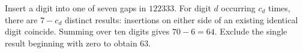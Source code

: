Insert a digit into one of seven gaps in $122333$. For digit $d$ occurring $c_d$ times, there are $7-c_d$ distinct results: insertions on either side of an existing identical digit coincide. Summing over ten digits gives $70-6=64$. Exclude the single result beginning with zero to obtain $\boxed{63}$.
